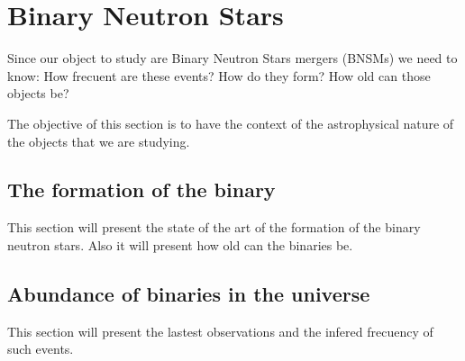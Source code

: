 

\chapter{Binary Neutron Stars}

Since our object to study are Binary Neutron Stars mergers  (BNSMs) we need to know: 
How frecuent are these events?
How do they form?
How old can those objects be?

The objective of this section is to have the context of the astrophysical nature of the objects that we are studying.

\section[The formation of the binary]{The formation of the binary}
This section will present the state of the art of the formation of the binary neutron stars.
Also it will present how old can the binaries be.


\section[Abundance of binaries in the universe]{Abundance of binaries in the universe}
This section will present the lastest observations and the infered frecuency of such events.


